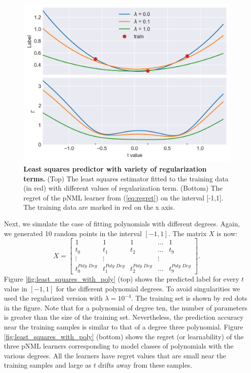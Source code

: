 \documentclass[conference,letterpaper]{IEEEtran}
\begin{document}
\begin{figure}[tb] 
    \centering
    \includegraphics[width=\linewidth]{least_squares_with_regularization.jpg}
    \caption{\textbf{Least squares predictor with variety of regularization terms.} (Top) The least squares estimator fitted to the training data (in red) with different values of regularization term. (Bottom) The regret of the pNML learner from (\ref{eq:regret}) on the interval [-1,1]. The training data are marked in red on the x axis.}
    \label{fig:least_squares_with_reg}
\end{figure}

Next, we simulate the case of fitting polynomials with different degrees. 
Again, we generated 10 random points in the interval $[-1, 1]$.
The matrix $X$ is now:
\begin{equation}
X = 
\begin{bmatrix}
1 & 1 & 1 & \hdots & 1\\
t_0 & t_1 & t_2 & \hdots & t_{9}\\
\vdots &  \vdots &       & \vdots  \\
t_0^{\textit{Poly Deg}} & t_1^{\textit{Poly Deg}} & t_2^{\textit{Poly Deg}}  & \hdots & t_{9}^{\textit{Poly Deg}}
\end{bmatrix}.
\end{equation}
Figure \ref{fig:least_squares_with_poly} (top) shows the predicted label for every $t$ value in $[-1,1]$ for the different polynomial degrees. 
To avoid singularities we used the regularized version with $\lambda=10^{-4}$. 
The training set is shown by red dots in the figure. 
Note that for a polynomial of degree ten, the number of parameters is greater than the size of the training set. 
Nevertheless, the prediction accuracy near the training samples is similar to that of a degree three polynomial.
Figure \ref{fig:least_squares_with_poly} (bottom) shows the regret (or learnability) of the three pNML learners corresponding to model classes of polynomials with the various degrees. 
All the learners have regret values that are small near the training samples and large as $t$ drifts away from these samples.
\end{document}
